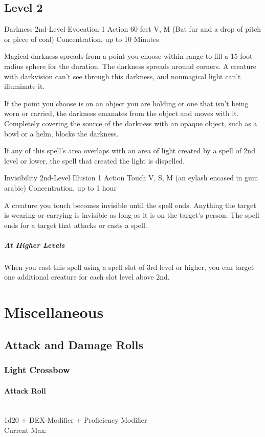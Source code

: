 {\subsection*{Level 2}

\DndSpellHeader
	{Darkness}
	{2nd-Level Evocation}
	{1 Action}
	{60 feet}
	{V, M (Bat fur and a drop of pitch or piece of coal)}
	{Concentration, up to 10 Minutes}
	
Magical darkness spreads from a point you choose within range to fill a 15-foot-radius sphere for the duration. The darkness spreads around corners. A creature with darkvision can't see through this darkness, and nonmagical light can't illuminate it.

If the point you choose is on an object you are holding or one that isn't being worn or carried, the darkness emanates from the object and moves with it. Completely covering the source of the darkness with an opaque object, such as a bowl or a helm, blocks the darkness.

If any of this spell's area overlaps with an area of light created by a spell of 2nd level or lower, the spell that created the light is dispelled.
	
\DndSpellHeader
	{Invisibility}
	{2nd-Level Illusion}
	{1 Action}
	{Touch}
	{V, S, M (an eylash encased in gum arabic)}
	{Concentration, up to 1 hour}

A creature you touch becomes invisible until the spell ends. Anything the target is wearing or carrying is invisible as long as it is on the target’s person. The spell ends for a target that attacks or casts a spell.

\subparagraph*{At Higher Levels} When you cast this spell using a spell slot of 3rd level or higher, you can target one additional creature for each slot level above 2nd.

\section*{Miscellaneous}
\subsection*{Attack and Damage Rolls}
\subsubsection*{Light Crossbow}
\paragraph*{Attack Roll}\hfill\\
1d20 + DEX-Modifier + Proficiency Modifier \\
\indent Current Max: 
}
